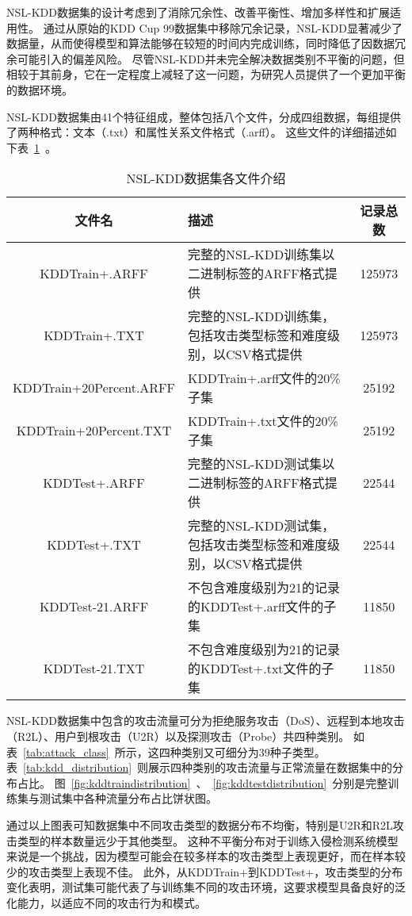 NSL-KDD数据集的设计考虑到了消除冗余性、改善平衡性、增加多样性和扩展适用性。
通过从原始的KDD Cup 99数据集中移除冗余记录，NSL-KDD显著减少了数据量，从而使得模型和算法能够在较短的时间内完成训练，同时降低了因数据冗余可能引入的偏差风险。
尽管NSL-KDD并未完全解决数据类别不平衡的问题，但相较于其前身，它在一定程度上减轻了这一问题，为研究人员提供了一个更加平衡的数据环境。


NSL-KDD数据集由41个特征组成，整体包括八个文件，分成四组数据，每组提供了两种格式：文本（.txt）和属性关系文件格式（.arff）。
这些文件的详细描述如下表~\ref{tab:NSLKDDFile}~。
\begin{table}[htbp]
  \caption{NSL-KDD数据集各文件介绍}
  \label{tab:NSLKDDFile}
  \begin{tabularx}{\textwidth}{cXc}
    \toprule
    \textbf{文件名} & \textbf{描述} & \textbf{记录总数}\\
  \midrule
    KDDTrain+.ARFF & 完整的NSL-KDD训练集以二进制标签的ARFF格式提供 &125973\\
    KDDTrain+.TXT & 完整的NSL-KDD训练集，包括攻击类型标签和难度级别，以CSV格式提供&125973\\
    KDDTrain+20Percent.ARFF & KDDTrain+.arff文件的20\%子集&25192\\
    KDDTrain+20Percent.TXT & KDDTrain+.txt文件的20\%子集 &25192\\
    KDDTest+.ARFF & 完整的NSL-KDD测试集以二进制标签的ARFF格式提供 &22544\\
    KDDTest+.TXT & 完整的NSL-KDD测试集，包括攻击类型标签和难度级别，以CSV格式提供 & 22544\\
    KDDTest-21.ARFF & 不包含难度级别为21的记录的KDDTest+.arff文件的子集 &11850\\
    KDDTest-21.TXT & 不包含难度级别为21的记录的KDDTest+.txt文件的子集&11850 \\
  \bottomrule
  \end{tabularx}
\end{table}

NSL-KDD数据集中包含的攻击流量可分为拒绝服务攻击（DoS）、远程到本地攻击（R2L）、用户到根攻击（U2R）以及探测攻击（Probe）共四种类别。
如表~\ref{tab:attack_class}~所示，这四种类别又可细分为39种子类型。
表~\ref{tab:kdd_distribution}~则展示四种类别的攻击流量与正常流量在数据集中的分布占比。
图~\ref{fig:kddtraindistribution}~、~\ref{fig:kddtestdistribution}~分别是完整训练集与测试集中各种流量分布占比饼状图。


通过以上图表可知数据集中不同攻击类型的数据分布不均衡，特别是U2R和R2L攻击类型的样本数量远少于其他类型。
这种不平衡分布对于训练入侵检测系统模型来说是一个挑战，因为模型可能会在较多样本的攻击类型上表现更好，而在样本较少的攻击类型上表现不佳。
此外，从KDDTrain+到KDDTest+，攻击类型的分布变化表明，测试集可能代表了与训练集不同的攻击环境，这要求模型具备良好的泛化能力，以适应不同的攻击行为和模式。



